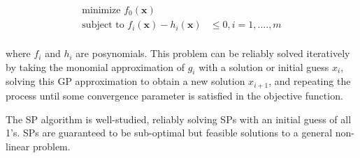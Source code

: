 \begin{equation}
\begin{aligned}
\text{minimize }f_{0}(\mathbf{x})& \\
\text{subject to }f_{i}(\mathbf{x}) - h_{i}(\mathbf{x})& \leq 0, i = 1, ...., m \\
\end{aligned}
\end{equation}

where $f_{i}$ and $h_{i}$ are posynomials. This problem can be reliably solved iteratively by taking the monomial approximation of $g_{i}$ with a solution or initial guess $x_{i}$, solving this GP approximation to obtain a new solution $x_{i+1}$, and repeating the process until some convergence parameter is satisfied in the objective function.

The SP algorithm is well-studied, reliably solving SPs with an initial guess of all 1’s. SPs are guaranteed to be sub-optimal but feasible solutions to a general non-linear problem.

